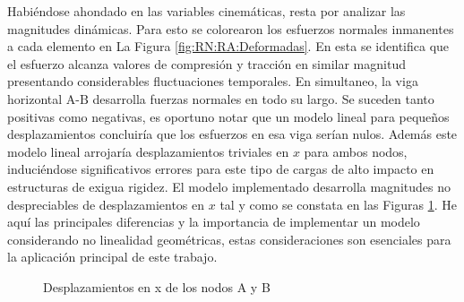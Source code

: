 Habiéndose ahondado en las variables cinemáticas, resta por analizar las magnitudes dinámicas. Para esto se colorearon los esfuerzos normales inmanentes a cada elemento en La Figura \ref{fig:RN:RA:Deformadas}. En esta se identifica que el esfuerzo alcanza valores de compresión y tracción en similar magnitud presentando considerables fluctuaciones temporales. En simultaneo, la viga horizontal $\text{A-B}$ desarrolla fuerzas normales en todo su largo. Se suceden tanto positivas como negativas, es oportuno notar que un modelo lineal para pequeños desplazamientos concluiría que los esfuerzos en esa viga serían nulos. Además este modelo lineal arrojaría desplazamientos triviales en $x$ para ambos nodos, induciéndose significativos errores para este tipo de cargas de alto impacto en estructuras de exigua rigidez. El modelo implementado desarrolla magnitudes no despreciables de desplazamientos en $x$ tal y como se constata en las Figuras \ref{fig:RN:RA:DispsXAB}. He aquí las principales diferencias y la importancia de implementar un modelo considerando no linealidad geométricas, estas consideraciones son esenciales para la aplicación principal de este trabajo.  


\begingroup
\centering
\begin{figure}[htbp]
	\centering
	\label{fig:RN:RA:DispxB}
	\label{fig:RN:RA:DispxA}
	\caption{Desplazamientos en x de los nodos A y B} \label{fig:RN:RA:DispsXAB}
\end{figure}
\endgroup

